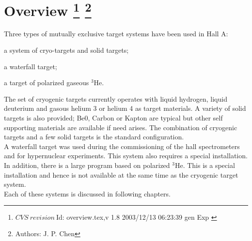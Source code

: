 \chapter[Overview]{ Overview
\footnote{
  $CVS~revision~ $Id: overview.tex,v 1.8 2003/12/13 06:23:39 gen Exp $ $ }
\footnote{Authors: J. P. Chen }
}
\label{sec:targets-overv}

Three types of mutually exclusive target systems have been used in Hall A:

\begin{list}{.~}{\setlength{\itemsep}{-0.15cm}}
  \item a system of cryo-targets and solid targets;
  \item a waterfall target;
  \item a target of polarized gaseous $^3$He.
\end{list}

The set of
cryogenic targets currently operates with liquid hydrogen, liquid
deuterium and gasous helium 3 or helium 4
as target materials.
A variety of solid targets is also provided; Be0, Carbon or
Kapton are typical but other self supporting materials are available if need arises.
The combination of cryogenic targets and a few solid targets is
the standard configuration. \\

A waterfall target was used during the commissioning of
the hall spectrometers and for hypernuclear experiments. This system also 
requires a special installation. \\

In addition,
there is a large program based on polarized $^3$He. This
is a special installation and hence is not available at the same
time as the cryogenic target system.\\

Each of these systems is discussed in following chapters.
%
%
%
%
%
%
%
%
